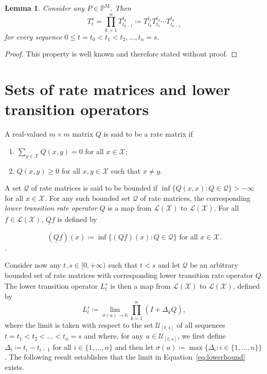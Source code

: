 \documentclass[a4paper,reqno]{amsart}
\newtheorem{lemma}[theorem]{Lemma}
\newcommand{\states}{\mathcal{X}}
\newcommand{\processes}{\mathbb{P}}
\newcommand{\mprocesses}{\processes^{\mathrm{M}}}
\newcommand{\lbound}{L}
\newcommand{\gambles}{\mathcal{L}}
\newcommand{\gamblesX}{\gambles(\states)}
\newcommand{\rateset}{\mathcal{Q}}
\newcommand{\lrate}{\underline{Q}}
\begin{document}
\begin{lemma}
Consider any $P\in\mprocesses$. Then
\begin{equation*}
T_t^s=\prod_{k=1}^n T_{t_{k-1}}^{t_k} \coloneqq T_{t_0}^{t_1}T_{t_1}^{t_2}\cdots T_{t_{n-1}}^{t_n}
\end{equation*}
for every sequence $0\leq t=t_0<t_1<t_2,\dots,t_{n}=s$.
\end{lemma}
\begin{proof}
This property is well known and therefore stated without proof.
\end{proof}

\section{Sets of rate matrices and lower transition operators}

A real-valued $m\times m$ matrix $Q$ is said to be a rate matrix if

\vspace{5pt}
\begin{enumerate}[label=R\arabic*:]
\item
$\sum_{y\in\states}Q(x,y)=0$ for all $x\in\states$;
\item
$Q(x,y)\geq0$ for all $x,y\in\states$ such that $x\neq y$.
\end{enumerate}
\vspace{5pt}

A set $\rateset$ of rate matrices is said to be bounded if $\inf\{Q(x,x)\colon Q\in\rateset\}>-\infty$ for all $x\in\states$. For any such bounded set $\rateset$ of rate matrices, the corresponding \emph{lower transition rate operator} $\lrate$ is a map from $\gamblesX$ to $\gamblesX$. For all $f\in\gamblesX$, $\lrate f$ is defined by

\begin{equation*}
(\lrate f)(x)\coloneqq\inf\{(Qf)(x)\colon Q\in\rateset\}\text{ for all $x\in\states$}.
\end{equation*}.

Consider now any $t,s\in[0,+\infty)$ such that $t<s$ and let $\rateset$ be an arbitrary bounded set of rate matrices with corresponding lower transition rate operator $\lrate$. The lower transition operator $\lbound_t^s$ is then a map from $\gamblesX$ to $\gamblesX$, defined by
\begin{equation}\label{eq:lowerbound}
\lbound_t^s\coloneqq\lim_{\sigma(u)\to0}\prod_{k=1}^n(I+\Delta_k\lrate),
\end{equation}
where the limit is taken with respect to the set $\mathcal{U}_{[t,s]}$ of all sequences $t=t_1<t_2<\dots<t_n=s$ and where, for any $u\in\mathcal{U}_{[t,s]}$, we first define $\Delta_i\coloneqq t_i-t_{i-1}$ for all $i\in\{1,\dots,n\}$ and then let $\sigma(u)\coloneqq\max\{\Delta_i\colon i\in\{1,\dots,n\}\}$. The following result establishes that the limit in Equation~\eqref{eq:lowerbound} exists.
\end{document}
